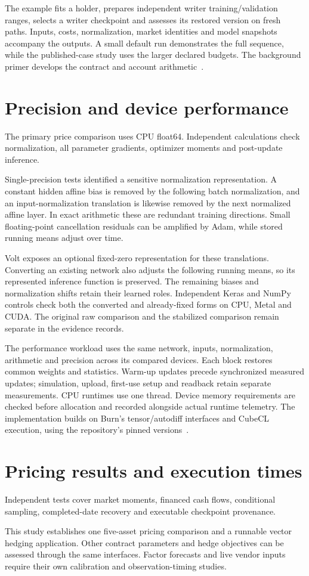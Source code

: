 \documentclass[8pt]{strategynet-journal}
\begin{document}
\begin{SNcolumns}
The example fits a holder, prepares independent writer training/validation
ranges, selects a writer checkpoint and assesses its restored version on
fresh paths. Inputs, costs, normalization, market identities and model
snapshots accompany the outputs. A small default run demonstrates the full
sequence, while the published-case study uses the larger declared budgets.
The background primer develops the contract and account arithmetic~\cite{primer}.

\section{Precision and device performance}
The primary price comparison uses CPU float64. Independent calculations check normalization,
all parameter gradients, optimizer moments and post-update inference.

Single-precision tests identified a sensitive normalization representation.
A constant hidden affine bias is removed by the following batch normalization,
and an input-normalization translation is likewise removed by the next
normalized affine layer. In exact arithmetic these are redundant training
directions. Small floating-point cancellation residuals can be amplified by
Adam, while stored running means adjust over time.

Volt exposes an optional fixed-zero representation for these translations.
Converting an existing network also adjusts the following running means, so
its represented inference function is preserved. The remaining biases and
normalization shifts retain their learned roles. Independent Keras and NumPy
controls check both the converted and already-fixed forms on CPU, Metal and
CUDA. The original raw comparison and the stabilized comparison remain
separate in the evidence records.

The performance workload uses the same network, inputs, normalization,
arithmetic and precision across its compared devices. Each block restores
common weights and statistics. Warm-up updates precede synchronized measured
updates; simulation, upload, first-use setup and readback retain separate
measurements. CPU runtimes use one thread. Device memory requirements are
checked before allocation and recorded alongside actual runtime telemetry.
The implementation builds on Burn's tensor/autodiff interfaces and CubeCL
execution, using the repository's pinned versions~\cite{burn}.

\section{Pricing results and execution times}


Independent tests cover market moments, financed cash flows, conditional
sampling, completed-date recovery and executable checkpoint provenance.

This study establishes one five-asset pricing comparison and a runnable vector
hedging application. Other contract parameters and hedge objectives can be
assessed through the same interfaces. Factor forecasts and live vendor inputs
require their own calibration and observation-timing studies.
\end{SNcolumns}
\end{document}

